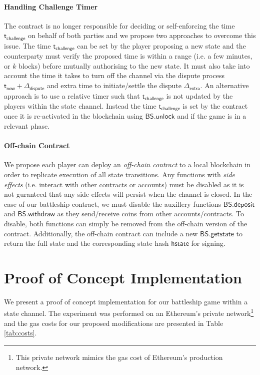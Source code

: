 \documentclass{llncs}
\newcommand{\hstate}{\mathsf{hstate}}
\newcommand{\battleshipdeposit}{\mathsf{BS.deposit}}
\newcommand{\battleshipwithdraw}{\mathsf{BS.withdraw}}
\newcommand{\battleshipunlock}{\mathsf{BS.unlock}}
\newcommand{\battleshipgetstate}{\mathsf{BS.getstate}}
\newcommand{\timechallenge}{\mathsf{t}_{\mathsf{challenge}}}
\newcommand{\timerextra}{\mathsf{\Delta}_{\mathsf{extra}}}
\newcommand{\timenow}{\mathsf{t}_{\mathsf{now}}}
\newcommand{\timedispute}{\timenow + \mathsf{\Delta}_{\mathsf{dispute}}}
\begin{document}
\paragraph{Handling Challenge Timer}\label{sec:timers}
The contract is no longer responsible for deciding or self-enforcing the time $\timechallenge$ on behalf of both parties and we propose two approaches to overcome this issue. 
The time $\timechallenge$ can be set by the player proposing a new state and the counterparty must verify the proposed time is within a range (i.e. a few minutes, or $k$ blocks) before mutually authorising to the new state.
It must also take into account the time it takes to turn off the channel via the dispute process $\timedispute$ and extra time to initiate/settle the dispute $\timerextra$. 
An alternative approach is to use a relative timer such that $\timechallenge$ is not updated by the players within the state channel.
Instead the time $\timechallenge$ is set by the contract once it is re-activated in the blockchain using $\battleshipunlock$ and if the game is in a relevant phase.

\paragraph{Off-chain Contract} 
We propose each player can deploy an \textit{off-chain contract} to a local blockchain in order to replicate execution of all state transitions. 
Any functions with \textit{side effects} (i.e. interact with other contracts or accounts) must be disabled as it is not guranteed that any side-effects will persist when the channel is closed. 
In the case of our battleship contract, we must disable the auxillery functions $\battleshipdeposit$ and $\battleshipwithdraw$ as they send/receive coins from other accounts/contracts. 
To disable, both functions can simply be removed from the off-chain version of the contract. 
Additionally, the off-chain contract can include a new $\battleshipgetstate$ to return the full state and the corresponding state hash $\hstate$ for signing. 

\section{Proof  of Concept Implementation}

We present a proof of concept implementation for our battleship game within a state channel.
The experiment was performed on an Ethereum's private network\footnote{This private network mimics the gas cost of Ethereum's production network.} and the gas costs for our proposed modifications are presented in Table \ref{tab:costs}. 
\end{document}
